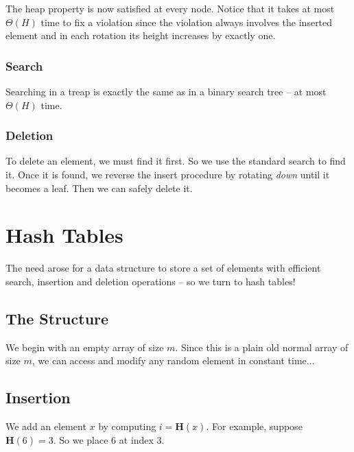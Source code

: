 The heap property is now satisfied at every node. Notice that it takes at most $\Theta(H)$ time to fix a 
violation since the violation always involves the inserted element and in each rotation its height 
increases by exactly one.

\subsubsection*{Search}
Searching in a treap is exactly the same as in a binary search tree -- at most $\Theta(H)$ time.

\subsubsection*{Deletion}
To delete an element, we must find it first. So we use the standard search to find it. Once it is found, 
we reverse the insert procedure by rotating \emph{down} until it becomes a leaf. Then we can safely 
delete it.

\section{Hash Tables}

The need arose for a data structure to store a set of elements with efficient search, 
insertion and deletion operations -- so we turn to hash tables!

\subsection{The Structure}

We begin with an empty array of size \(m\). Since this is a plain old normal 
array of size \(m\), we can access and modify 
any random element in constant time$\dots$

\begin{center}
\end{center}

\subsection{Insertion}
We add an element \(x\) by computing $i=\mathbf{H}(x)$. For example, 
suppose $\mathbf{H}(6)=3$. So we place \(6\) at index \(3\).


